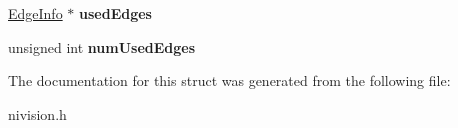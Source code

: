 \begin{DoxyCompactItemize}
\item 
\hypertarget{structStraightEdge__struct_a1ffc78d28662a92aad0c5c8bbd6996fa}{
\hyperlink{structEdgeInfo__struct}{EdgeInfo} $\ast$ {\bfseries usedEdges}}
\label{structStraightEdge__struct_a1ffc78d28662a92aad0c5c8bbd6996fa}

\item 
\hypertarget{structStraightEdge__struct_af19132c48caeac131001b7df209ec8e4}{
unsigned int {\bfseries numUsedEdges}}
\label{structStraightEdge__struct_af19132c48caeac131001b7df209ec8e4}

\end{DoxyCompactItemize}


The documentation for this struct was generated from the following file:\begin{DoxyCompactItemize}
\item 
nivision.h\end{DoxyCompactItemize}
